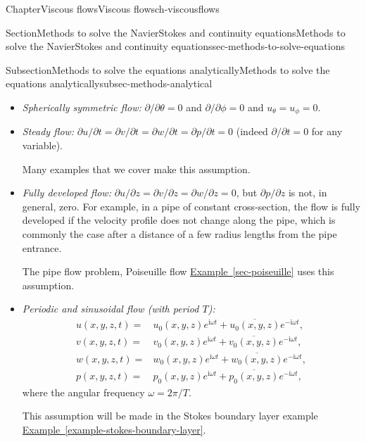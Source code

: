 \documentclass[oneside,10pt,]{book}
\newcommand{\xreffont}{\relax}
\newcommand{\ptxlistdisc}{\raisebox{0.3ex}{\textbullet}}
\numberwithin{equation}{section}
\newcommand{\im}{\mathrm{i}}
\begin{document}
\begin{chapterptx}{Chapter}{Viscous flows}{}{Viscous flows}{}{}{ch-viscousflows}
\begin{sectionptx}{Section}{Methods to solve the Navier\textendash{}Stokes and continuity equations}{}{Methods to solve the Navier\textendash{}Stokes and continuity equations}{}{}{sec-methods-to-solve-equations}
\begin{subsectionptx}{Subsection}{Methods to solve the equations analytically}{}{Methods to solve the equations analytically}{}{}{subsec-methods-analytical}
\begin{itemize}[label=\ptxlistdisc]
=\partial u_z/\theta=\partial p/\) (indeed \(\partial/\partial\theta=0\) for all variables) but \(u_\theta\) is not necesarily zero. For example a line vortex is rotationally symmetric but not axisymmetric. We can similarly write Problems of this sort can also be written in spherical coordinates (in which case \(\partial {}{\phi}=0\)).%
\item{}\emph{Spherically symmetric flow:} \(\partial/\partial\theta=0\) and \(\partial/\partial\phi=0\) and \(u_\theta=u_\phi=0\).%
\item{}\emph{Steady flow:} \(\partial u/\partial t=\partial v/\partial t
=\partial w/\partial t=\partial p/\partial t=0\) (indeed \(\partial/\partial t=0\) for any variable).%
\par
Many examples that we cover make this assumption.%
\item{}\emph{Fully developed flow:} \(\partial u/\partial z=\partial v/\partial z=\partial w/\partial z=0\), but \(\partial p/\partial z\) is not, in general, zero. For example, in a pipe of constant cross-section, the flow is fully developed if the velocity profile does not change along the pipe, which is commonly the case after a distance of a few radius lengths from the pipe entrance.%
\par
The pipe flow problem, Poiseuille flow \hyperref[sec-poiseuille]{Example~{\xreffont\ref{sec-poiseuille}}} uses this assumption.%
\item{}\emph{Periodic and sinusoidal flow (with period \(T\)):}%
\begin{align*}
u(x,y,z,t)=&u_0(x,y,z)e^{\im\omega t}+\overline{u_0(x,y,z)}e^{-\im\omega t},\\
v(x,y,z,t)=&v_0(x,y,z)e^{\im\omega t}+\overline{v_0(x,y,z)}e^{-\im\omega t},\\
w(x,y,z,t)=&w_0(x,y,z)e^{\im\omega t}+\overline{w_0(x,y,z)}e^{-\im\omega t},\\
p(x,y,z,t)=&p_0(x,y,z)e^{\im\omega t}+\overline{p_0(x,y,z)}e^{-\im\omega t},
\end{align*}
where the angular frequency \(\omega=2\pi/T\).%
\par
This assumption will be made in the Stokes boundary layer example \hyperref[example-stokes-boundary-layer]{Example~{\xreffont\ref{example-stokes-boundary-layer}}}.%
\end{itemize}

\end{subsectionptx}
\end{sectionptx}
\end{chapterptx}
\end{document}
